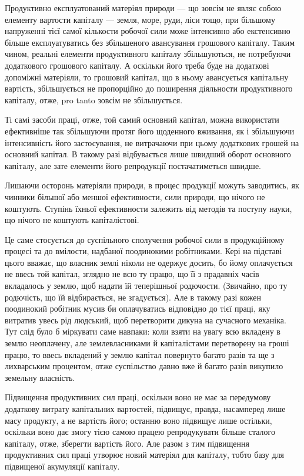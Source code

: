 Продуктивно експлуатований матеріял природи — що зовсім не являє
собою елементу вартости капіталу — земля, море, руди, ліси тощо, при
більшому напруженні тієї самої кількости робочої сили може інтенсивно
або екстенсивно більше експлуатуватись без збільшеного авансування грошового
капіталу. Таким чином, реальні елементи продуктивного капіталу
збільшуються, не потребуючи додаткового грошового капіталу. А оскільки
його треба буде на додаткові допоміжні матеріяли, то грошовий капітал,
що в ньому авансується капітальну вартість, збільшується не пропорційно
до поширення діяльности продуктивного капіталу, отже, pro
tanto зовсім не збільшується.

Ті самі засоби праці, отже, той самий основний капітал, можна використати
ефективніше так збільшуючи протяг його щоденного вживання,
як і збільшуючи інтенсивнісгь його застосування, не витрачаючи
при цьому додаткових грошей на основний капітал. В такому разі відбувається
лише швидший оборот основного капіталу, але зате елементи
його репродукції постачатиметься швидше.

Лишаючи осторонь матеріяли природи, в процес продукції можуть
заводитись, як чинники більшої або меншої ефективности, сили
природи, що нічого не коштують. Ступінь їхньої ефективности
залежить від методів та поступу науки, що нічого не коштують капіталістові.

Це саме стосується до суспільного сполучення робочої сили в продукційному
процесі та до вмілости, надбаної поодинокими робітниками.
Кері на підставі цього вважає, що власник землі ніколи не одержує досить,
бо йому оплачується не ввесь той капітал, зглядно не всю ту
працю, що її з прадавніх часів вкладалось у землю, щоб надати їй теперішньої
родючости. (Звичайно, про ту родючість, що їй відбирається,
не згадується). Але в такому разі кожен поодинокий робітник мусив
би оплачуватись відповідно до тієї праці, яку витратив увесь рід людський,
щоб перетворити дикуна на сучасного механіка. Тут слід було б
міркувати саме навпаки: коли взяти на увагу всю вкладену в землю
неоплачену, але землевласниками й капіталістами перетворену на гроші
працю, то ввесь вкладений у землю капітал повернуто багато разів та
ще з лихварським процентом, отже суспільство давно вже й багато
разів викупило земельну власність.

Підвищення продуктивних сил праці, оскільки воно не має за передумову
додаткову витрату капітальних вартостей, підвищує, правда, насамперед
лише масу продукту, а не вартість його; останню воно підвищує
лише остільки, оскільки воно дає змогу тією самою працею репродукувати
більше сталого капіталу, отже, зберегти вартість його. Але разом з
тим підвищення продуктивних сил праці утворює новий матеріял для капіталу,
тобто базу для підвищеної акумуляції капіталу.

